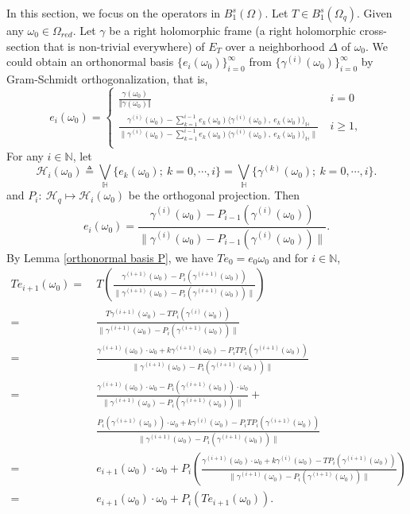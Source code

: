 \documentclass[pdflatex,sn-mathphys-num]{sn-jnl}%
\theoremstyle{thmstyleone}%
\theoremstyle{thmstyletwo}%
\theoremstyle{thmstylethree}%
\theoremstyle{definition}
\theoremstyle{remark}
\begin{document}
In this section, we focus on the operators in $B_1^{s}(\Omega)$. Let $T\in B_1^{s}(\Omega_q)$. Given any $\omega_0\in\Omega_{red}$. Let $\gamma$ be a right holomorphic frame (a right holomorphic cross-section that is non-trivial everywhere) of $E_T$ over a neighborhood $\Delta$ of $\omega_0$. We could obtain an orthonormal basis $\{e_i(\omega_0)\}_{i=0}^{\infty}$ from $\{\gamma^{(i)}(\omega_0)\}_{i=0}^{\infty}$ by Gram-Schmidt orthogonalization, that is,
\begin{equation}\label{orthonormal basis }
	e_i(\omega_0)=\begin{cases}
		\frac{\gamma(\omega_0)}{\Vert\gamma(\omega_0)\Vert}\ & i=0 \\
		\frac{\gamma^{(i)}(\omega_0)-\sum_{k=1}^{i-1}e_k(\omega_0){\langle\gamma^{(i)}(\omega_0),\ e_k(\omega_0)\rangle_{\mathbb{H}}}}
		{\|\gamma^{(i)}(\omega_0)-\sum_{k=1}^{i-1}e_k(\omega_0){\langle\gamma^{(i)}(\omega_0),\ e_k(\omega_0)\rangle_{\mathbb{H}}}\|}\ & i\ge1,\\
	\end{cases}
\end{equation}
For any $i\in\mathbb{N}$, let
\[
\mathcal{H}_i(\omega_0)\triangleq{\bigvee}_{\mathbb{H}}\{e_k(\omega_0);\ k=0,\cdots,i\}={\bigvee}_{\mathbb{H}}\{\gamma^{(k)}(\omega_0); \ k=0,\cdots,i\}.
\]
and $P_i:\ \mathcal{H}_{q}\mapsto\mathcal{H}_{i}(\omega_0)$ be the orthogonal projection. Then
\[
e_i(\omega_0)=\frac{\gamma^{(i)}(\omega_0)-P_{i-1}(\gamma^{(i)}(\omega_0))}
{\|\gamma^{(i)}(\omega_0)-P_{i-1}(\gamma^{(i)}(\omega_0))\|}.
\]
By Lemma \ref{orthonormal basis P}, we have $Te_0=e_0\omega_0$ and for $i\in\mathbb{N}$,
\[
\begin{aligned}
Te_{i+1}(\omega_0)=& \ T\left(\frac{\gamma^{(i+1)}(\omega_0)-P_{i}(\gamma^{(i+1)}(\omega_0))}
{\|\gamma^{(i+1)}(\omega_0)-P_{i}(\gamma^{(i+1)}(\omega_0))\|}\right) \\
=& \ \frac{T\gamma^{(i+1)}(\omega_0)-TP_{i}(\gamma^{(i)}(\omega_0))}
{\|\gamma^{(i+1)}(\omega_0)-P_{i}(\gamma^{(i+1)}(\omega_0))\|} \\
=& \ \frac{\gamma^{(i+1)}(\omega_0)\cdot\omega_0+k\gamma^{(i+1)}(\omega_0)-P_{i}TP_i(\gamma^{(i+1)}(\omega_0))}
{\|\gamma^{(i+1)}(\omega_0)-P_{i}(\gamma^{(i+1)}(\omega_0))\|} \\
=& \ \frac{\gamma^{(i+1)}(\omega_0)\cdot\omega_0-P_{i}(\gamma^{(i+1)}(\omega_0))\cdot\omega_0}
{\|\gamma^{(i+1)}(\omega_0)-P_{i}(\gamma^{(i+1)}(\omega_0))\|}+ \\
&\ \frac{P_{i}(\gamma^{(i+1)}(\omega_0))\cdot\omega_0+k\gamma^{(i)}(\omega_0)-P_{i}TP_i(\gamma^{(i+1)}(\omega_0))}
{\|\gamma^{(i+1)}(\omega_0)-P_{i}(\gamma^{(i+1)}(\omega_0))\|} \\
=&\ e_{i+1}(\omega_0)\cdot\omega_0+P_i\left(\frac{\gamma^{(i+1)}(\omega_0)\cdot\omega_0+k\gamma^{(i)}(\omega_0)-TP_i(\gamma^{(i+1)}(\omega_0))}{\|\gamma^{(i+1)}(\omega_0)-P_{i}(\gamma^{(i+1)}(\omega_0))\|}\right)\\
=&\ e_{i+1}(\omega_0)\cdot\omega_0+P_i(Te_{i+1}(\omega_0)).
\end{aligned}
\]
\end{document}
